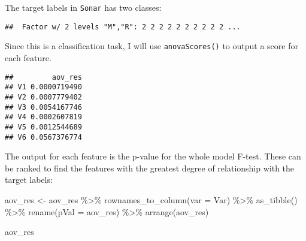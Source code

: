 \documentclass[
]{book}
\newenvironment{Shaded}{\begin{snugshade}}{\end{snugshade}}
\newcommand{\AttributeTok}[1]{\textcolor[rgb]{0.77,0.63,0.00}{#1}}
\newcommand{\ControlFlowTok}[1]{\textcolor[rgb]{0.13,0.29,0.53}{\textbf{#1}}}
\newcommand{\DecValTok}[1]{\textcolor[rgb]{0.00,0.00,0.81}{#1}}
\newcommand{\FunctionTok}[1]{\textcolor[rgb]{0.00,0.00,0.00}{#1}}
\newcommand{\NormalTok}[1]{#1}
\newcommand{\OtherTok}[1]{\textcolor[rgb]{0.56,0.35,0.01}{#1}}
\newcommand{\SpecialCharTok}[1]{\textcolor[rgb]{0.00,0.00,0.00}{#1}}
\newcommand{\StringTok}[1]{\textcolor[rgb]{0.31,0.60,0.02}{#1}}
\begin{document}
The target labels in \texttt{Sonar} has two classes:

\begin{Shaded}
\end{Shaded}

\begin{verbatim}
##  Factor w/ 2 levels "M","R": 2 2 2 2 2 2 2 2 2 2 ...
\end{verbatim}

Since this is a classification task, I will use \texttt{anovaScores()} to output a score for each feature.

\begin{Shaded}
\end{Shaded}

\begin{verbatim}
##         aov_res
## V1 0.0000719490
## V2 0.0007779402
## V3 0.0054167746
## V4 0.0002607819
## V5 0.0012544689
## V6 0.0567376774
\end{verbatim}

The output for each feature is the p-value for the whole model F-test. These can be ranked to find the features with the greatest degree of relationship with the target labels:

\begin{Shaded}
\begin{Highlighting}[]
\NormalTok{aov\_res }\OtherTok{\textless{}{-}}\NormalTok{ aov\_res }\SpecialCharTok{\%\textgreater{}\%} \FunctionTok{rownames\_to\_column}\NormalTok{(}\AttributeTok{var =} \StringTok{\textquotesingle{}Var\textquotesingle{}}\NormalTok{) }\SpecialCharTok{\%\textgreater{}\%}
  \FunctionTok{as\_tibble}\NormalTok{() }\SpecialCharTok{\%\textgreater{}\%} \FunctionTok{rename}\NormalTok{(}\AttributeTok{pVal =}\NormalTok{ aov\_res) }\SpecialCharTok{\%\textgreater{}\%} \FunctionTok{arrange}\NormalTok{(aov\_res)}

\NormalTok{aov\_res}
\end{Highlighting}
\end{Shaded}
\end{document}
